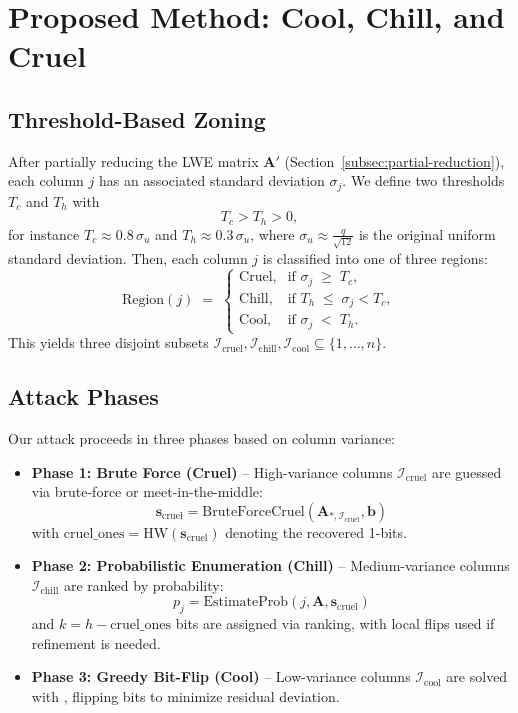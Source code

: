 \documentclass[conference]{IEEEtran}
\begin{document}
\section{Proposed Method: \texorpdfstring{Cool, Chill, and Cruel}{Cool, Chill, and Cruel}}
\label{sec:proposed-ccc}

\subsection{Threshold-Based Zoning}
\label{subsec:threshold-zoning}

After partially reducing the LWE matrix $\mathbf{A}'$ (Section~\ref{subsec:partial-reduction}), each column $j$ has an associated standard deviation $\sigma_j$. We define two thresholds $T_c$ and $T_h$ with 
\[
  T_c > T_h > 0,
\]
for instance $T_c \approx 0.8 \,\sigma_u$ and $T_h \approx 0.3\, \sigma_u$, where $\sigma_u \approx \frac{q}{\sqrt{12}}$ is the original uniform standard deviation. Then, each column $j$ is classified into one of three regions:
\[
  \mathrm{Region}(j) \;=\;
  \begin{cases}
    \text{Cruel}, & \text{if } \sigma_j \;\ge\; T_c,\\
    \text{Chill}, & \text{if } T_h \;\le\; \sigma_j < T_c,\\
    \text{Cool}, & \text{if } \sigma_j \;<\; T_h.
  \end{cases}
\]
This yields three disjoint subsets $\mathcal{I}_{\mathrm{cruel}}, \mathcal{I}_{\mathrm{chill}}, \mathcal{I}_{\mathrm{cool}} \subseteq \{1,\ldots,n\}$.

\subsection{Attack Phases}
\label{subsec:attack-phases}

Our attack proceeds in three phases based on column variance:

\begin{itemize}
  \item \textbf{Phase 1: Brute Force (Cruel)} – High-variance columns \(\mathcal{I}_{\mathrm{cruel}}\) are guessed via brute-force or meet-in-the-middle:
    \[
    \mathbf{s}_{\mathrm{cruel}} = \mathrm{BruteForceCruel}(\mathbf{A}_{*, \mathcal{I}_{\mathrm{cruel}}}, \mathbf{b})
    \]
    with \(\mathrm{cruel\_ones} = \mathrm{HW}(\mathbf{s}_{\mathrm{cruel}})\) denoting the recovered 1-bits.

  \item \textbf{Phase 2: Probabilistic Enumeration (Chill)} – Medium-variance columns \(\mathcal{I}_{\mathrm{chill}}\) are ranked by probability:
    \[
    p_j = \mathrm{EstimateProb}(j, \mathbf{A}, \mathbf{s}_{\mathrm{cruel}})
    \]
    and \( k = h - \mathrm{cruel\_ones} \) bits are assigned via ranking, with local flips used if refinement is needed.

  \item \textbf{Phase 3: Greedy Bit-Flip (Cool)} – Low-variance columns \(\mathcal{I}_{\mathrm{cool}}\) are solved with , flipping bits to minimize residual deviation.
\end{itemize}
\end{document}
